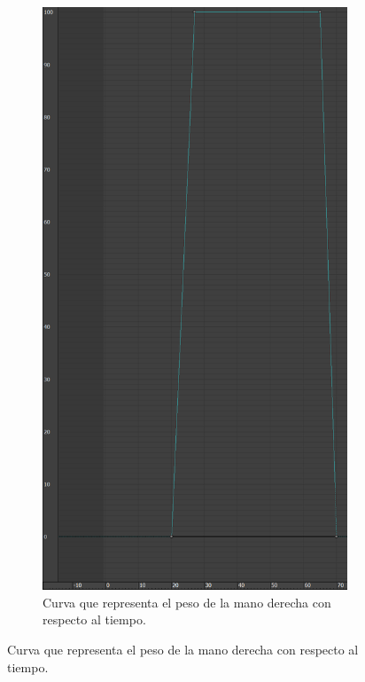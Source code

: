 \begin{figure}[H]
\begin{subfigure}[t]{0.27\textwidth}
    \end{subfigure}
   \hfill
    \begin{subfigure}[t]{0.27\textwidth}
       \centering
       \includegraphics[width=\textwidth]{imagenes/espada/peso1.png}
       \caption{Curva que representa el peso de la mano derecha con respecto al tiempo.}
    \end{subfigure}

\end{figure}
